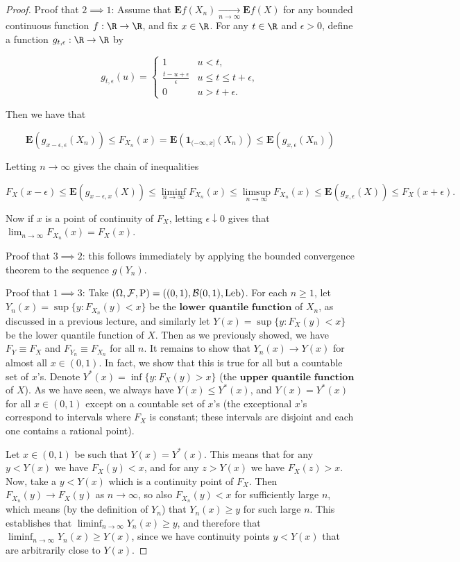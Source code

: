 \begin{proof}
Proof that $2\implies 1$: Assume that
$\mathbf{E} f(X_n) \xrightarrow[n\to\infty]{}
\mathbf{E} f(X)$
for any bounded continuous function $f:\R\to\R$, and
fix $x\in \R$. For any $t\in \R$ and $\epsilon>0$,
define a function $g_{t,\epsilon}:\R\to\R$ by

\[
g_{t,\epsilon}(u) = \begin{cases}
1 & u<t, \\
\frac{t-u+\epsilon}{\epsilon} & u \le t \le t+\epsilon, \\
0 & u>t+\epsilon.
\end{cases}
\]

\noindent Then we have that

\[
\mathbf{E} (g_{x-\epsilon,\epsilon}(X_n)) \le F_{X_n}(x) = \mathbf{E}(\mathbf{1}_{(-\infty,x]}(X_n)) \le \mathbf{E}(g_{x,\epsilon}(X_n))
\]

\noindent Letting $n\to\infty$ gives the chain of inequalities

\[
F_{X}(x-\epsilon) \le \mathbf{E}(g_{x-\epsilon,x}(X)) \le \liminf_{n\to\infty} F_{X_n}(x) \le \limsup_{n\to\infty}
F_{X_n}(x) \le \mathbf{E}(g_{x,\epsilon}(X)) \le F_X(x+\epsilon).
\]

\noindent Now if $x$ is a point of continuity of $F_X$, letting
$\epsilon \downarrow 0$ gives that
$\lim_{n\to\infty}F_{X_n}(x) = F_X(x)$.

Proof that $3\implies 2$: this follows immediately by
applying the bounded convergence theorem to the
sequence $g(Y_n)$.

Proof that $1 \implies 3$: Take
$(\Omega,{\cal F},\mathrm{P}) = ((0,1),{\cal B}(0,1),
\textrm{Leb})$.
For each $n\ge 1$, let
$Y_n(x) = \sup\{ y : F_{X_n}(y) < x \}$ be the
$\textbf{lower quantile function}$ of $X_n$, as
discussed in a previous lecture, and similarly let
$Y(x)=\sup\{ y : F_X(y)<x\}$ be the lower quantile
function of $X$. Then as we previously showed, we
have $F_Y \equiv F_X$ and $F_{Y_n}\equiv F_{X_n}$ for
all $n$. It remains to show that $Y_n(x)\to Y(x)$ for
almost all $x\in(0,1)$. In fact, we show that this is
true for all but a countable set of $x$'s. Denote
$Y^*(x) = \inf\{ y : F_X(y)>x\}$ (the
$\textbf{upper quantile function}$ of $X$). As we
have seen, we always have $Y(x) \le Y^*(x)$, and
$Y(x) = Y^*(x)$ for all $x\in(0,1)$ except on a
countable set of $x$'s (the exceptional $x$'s
correspond to intervals where $F_X$ is constant;
these intervals are disjoint and each one contains a
rational point).

Let $x\in(0,1)$ be such that $Y(x)=Y^*(x)$. This
means that for any $y<Y(x)$ we have $F_X(y)<x$, and
for any $z>Y(x)$ we have $F_X(z)>x$. Now, take a
$y<Y(x)$ which is a continuity point of $F_X$. Then
$F_{X_n}(y)\to F_X(y)$ as $n\to\infty$, so also
$F_{X_n}(y)< x$ for sufficiently large $n$, which
means (by the definition of $Y_n$) that $Y_n(x)\ge y$
for such large $n$. This establishes that
$\liminf_{n\to\infty} Y_n(x)\ge y$, and therefore
that $\liminf_{n\to\infty} Y_n(x)\ge Y(x)$, since we
have continuity points $y<Y(x)$ that are arbitrarily
close to $Y(x)$.


\end{proof}
